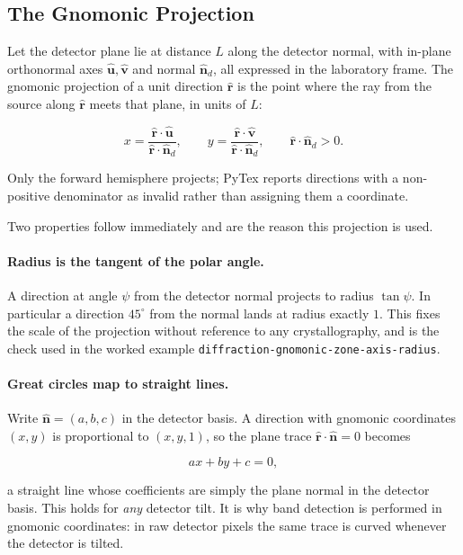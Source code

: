 \subsection{The Gnomonic Projection}

Let the detector plane lie at distance $L$ along the detector normal, with
in-plane orthonormal axes $\hat{\mathbf{u}}, \hat{\mathbf{v}}$ and normal
$\hat{\mathbf{n}}_d$, all expressed in the laboratory frame. The gnomonic
projection of a unit direction $\hat{\mathbf{r}}$ is the point where the ray from
the source along $\hat{\mathbf{r}}$ meets that plane, in units of $L$:

\[
  x = \frac{\hat{\mathbf{r}} \cdot \hat{\mathbf{u}}}
           {\hat{\mathbf{r}} \cdot \hat{\mathbf{n}}_d},
  \qquad
  y = \frac{\hat{\mathbf{r}} \cdot \hat{\mathbf{v}}}
           {\hat{\mathbf{r}} \cdot \hat{\mathbf{n}}_d},
  \qquad
  \hat{\mathbf{r}} \cdot \hat{\mathbf{n}}_d > 0 .
\]

Only the forward hemisphere projects; PyTex reports directions with a
non-positive denominator as invalid rather than assigning them a coordinate.

Two properties follow immediately and are the reason this projection is used.

\paragraph{Radius is the tangent of the polar angle.}
A direction at angle $\psi$ from the detector normal projects to radius
$\tan\psi$. In particular a direction $45^\circ$ from the normal lands at radius
exactly $1$. This fixes the scale of the projection without reference to any
crystallography, and is the check used in the worked example
\texttt{diffraction-gnomonic-zone-axis-radius}.

\paragraph{Great circles map to straight lines.}
Write $\hat{\mathbf{n}} = (a, b, c)$ in the detector basis. A direction with
gnomonic coordinates $(x, y)$ is proportional to $(x, y, 1)$, so the plane trace
$\hat{\mathbf{r}} \cdot \hat{\mathbf{n}} = 0$ becomes

\[
  a x + b y + c = 0,
\]

a straight line whose coefficients are simply the plane normal in the detector
basis. This holds for \emph{any} detector tilt. It is why band detection is
performed in gnomonic coordinates: in raw detector pixels the same trace is
curved whenever the detector is tilted.

